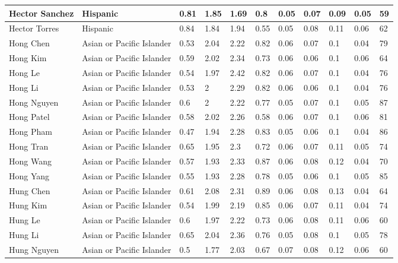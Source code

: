 \begin{table}[!ht]
\begin{tabular}{|l|l|l|l|l|l|l|l|l|l|l|}
        Hector Sanchez & Hispanic & 0.81 & 1.85 & 1.69 & 0.8 & 0.05 & 0.07 & 0.09 & 0.05 & 59 \\ \hline
        Hector Torres & Hispanic & 0.84 & 1.84 & 1.94 & 0.55 & 0.05 & 0.08 & 0.11 & 0.06 & 62 \\ \hline
        Hong Chen & Asian or Pacific Islander & 0.53 & 2.04 & 2.22 & 0.82 & 0.06 & 0.07 & 0.1 & 0.04 & 79 \\ \hline
        Hong Kim & Asian or Pacific Islander & 0.59 & 2.02 & 2.34 & 0.73 & 0.06 & 0.06 & 0.1 & 0.06 & 64 \\ \hline
        Hong Le & Asian or Pacific Islander & 0.54 & 1.97 & 2.42 & 0.82 & 0.06 & 0.07 & 0.1 & 0.04 & 76 \\ \hline
        Hong Li & Asian or Pacific Islander & 0.53 & 2 & 2.29 & 0.82 & 0.06 & 0.06 & 0.1 & 0.04 & 76 \\ \hline
        Hong Nguyen & Asian or Pacific Islander & 0.6 & 2 & 2.22 & 0.77 & 0.05 & 0.07 & 0.1 & 0.05 & 87 \\ \hline
        Hong Patel & Asian or Pacific Islander & 0.58 & 2.02 & 2.26 & 0.58 & 0.06 & 0.07 & 0.1 & 0.06 & 81 \\ \hline
        Hong Pham & Asian or Pacific Islander & 0.47 & 1.94 & 2.28 & 0.83 & 0.05 & 0.06 & 0.1 & 0.04 & 86 \\ \hline
        Hong Tran & Asian or Pacific Islander & 0.65 & 1.95 & 2.3 & 0.72 & 0.06 & 0.07 & 0.11 & 0.05 & 74 \\ \hline
        Hong Wang & Asian or Pacific Islander & 0.57 & 1.93 & 2.33 & 0.87 & 0.06 & 0.08 & 0.12 & 0.04 & 70 \\ \hline
        Hong Yang & Asian or Pacific Islander & 0.55 & 1.93 & 2.28 & 0.78 & 0.05 & 0.06 & 0.1 & 0.05 & 85 \\ \hline
        Hung Chen & Asian or Pacific Islander & 0.61 & 2.08 & 2.31 & 0.89 & 0.06 & 0.08 & 0.13 & 0.04 & 64 \\ \hline
        Hung Kim & Asian or Pacific Islander & 0.54 & 1.99 & 2.19 & 0.85 & 0.06 & 0.07 & 0.11 & 0.04 & 74 \\ \hline
        Hung Le & Asian or Pacific Islander & 0.6 & 1.97 & 2.22 & 0.73 & 0.06 & 0.08 & 0.11 & 0.06 & 60 \\ \hline
        Hung Li & Asian or Pacific Islander & 0.65 & 2.04 & 2.36 & 0.76 & 0.05 & 0.08 & 0.1 & 0.05 & 78 \\ \hline
        Hung Nguyen & Asian or Pacific Islander & 0.5 & 1.77 & 2.03 & 0.67 & 0.07 & 0.08 & 0.12 & 0.06 & 60 \\ \hline

\end{tabular}
\end{table}
